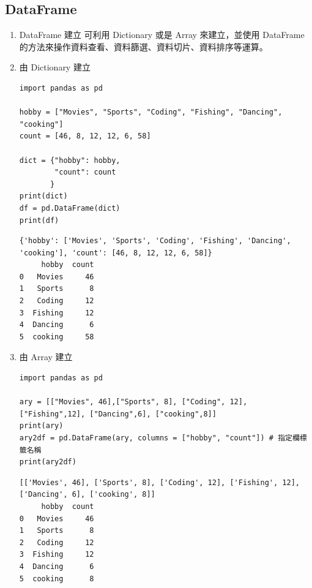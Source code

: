 \documentclass[a4paper,12pt]{article}
\begin{document}
\subsection{DataFrame}
\label{sec:org3114fb3}
\begin{enumerate}
\item DataFrame 建立
\label{sec:orgc0508f3}
可利用 Dictionary 或是 Array 來建立，並使用 DataFrame 的方法來操作資料查看、資料篩選、資料切片、資料排序等運算。\\
\item 由 Dictionary 建立
\label{sec:org5259300}
\lstset{breaklines=true,language=Python,label= ,caption= ,captionpos=b,firstnumber=1,numbers=left}
\begin{lstlisting}
import pandas as pd

hobby = ["Movies", "Sports", "Coding", "Fishing", "Dancing", "cooking"]
count = [46, 8, 12, 12, 6, 58]

dict = {"hobby": hobby,
        "count": count
       }
print(dict)
df = pd.DataFrame(dict)
print(df)
\end{lstlisting}

\begin{verbatim}
{'hobby': ['Movies', 'Sports', 'Coding', 'Fishing', 'Dancing', 'cooking'], 'count': [46, 8, 12, 12, 6, 58]}
     hobby  count
0   Movies     46
1   Sports      8
2   Coding     12
3  Fishing     12
4  Dancing      6
5  cooking     58
\end{verbatim}

\item 由 Array 建立
\label{sec:org3b45d68}
\lstset{breaklines=true,language=Python,label= ,caption= ,captionpos=b,firstnumber=1,numbers=left}
\begin{lstlisting}
import pandas as pd

ary = [["Movies", 46],["Sports", 8], ["Coding", 12], ["Fishing",12], ["Dancing",6], ["cooking",8]]
print(ary)
ary2df = pd.DataFrame(ary, columns = ["hobby", "count"]) # 指定欄標籤名稱
print(ary2df)

\end{lstlisting}

\begin{verbatim}
[['Movies', 46], ['Sports', 8], ['Coding', 12], ['Fishing', 12], ['Dancing', 6], ['cooking', 8]]
     hobby  count
0   Movies     46
1   Sports      8
2   Coding     12
3  Fishing     12
4  Dancing      6
5  cooking      8
\end{verbatim}


\end{enumerate}
\end{document}
